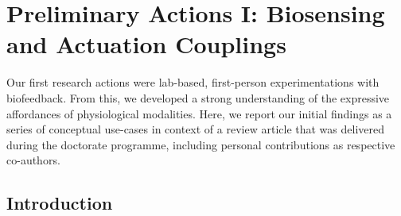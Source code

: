 \chapter{Preliminary Actions I: Biosensing and Actuation Couplings}
\label{cha:Preliminary_Actions_sens_act}

Our first research actions were lab-based, first-person experimentations  with biofeedback. From this, we developed a strong understanding of the expressive affordances of physiological modalities. Here, we report our initial findings as a series of conceptual use-cases in context of a review article that was delivered during the doctorate programme, including personal contributions as respective co-authors.




\section{Introduction}

